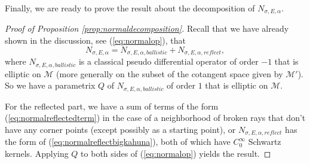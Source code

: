 \documentclass[10pt]{amsart}
\theoremstyle{definition}
\theoremstyle{definition}
\theoremstyle{definition}
\begin{document}
Finally, we are ready to prove the result about the decomposition of $N_{\sigma, E, \alpha}$.
\begin{proof}[Proof of Proposition \ref{prop:normaldecomposition}] Recall that we have already shown in the discussion, see (\ref{eq:normalop}), that
\begin{equation*}
N_{\sigma, E, \alpha} = N_{\sigma, E, \alpha, ballistic} + N_{\sigma, E, \alpha, reflect},
\end{equation*}
where $N_{\sigma, E, \alpha, ballistic}$ is a classical pseudo differential operator of order $-1$ that is elliptic on $\mathcal{M}$ (more generally on the subset of the cotangent space given by $\mathcal{M}'$). So we have a parametrix $Q$ of $N_{\sigma, E,\alpha, ballistic}$ of order $1$ that is elliptic on $\mathcal{M}$.

For the reflected part, we have a sum of terms of the form (\ref{eq:normalreflectedterm}) in the case of a neighborhood of broken rays that don't have any corner points (except possibly as a starting point), or $N_{\sigma, E, \alpha, reflect}$ has the form of (\ref{eq:normalreflectbigkahuna}), both of which have $C_{0}^{\infty}$ Schwartz kernels. Applying $Q$ to both sides of (\ref{eq:normalop}) yields the result.
\end{proof}
\end{document}
